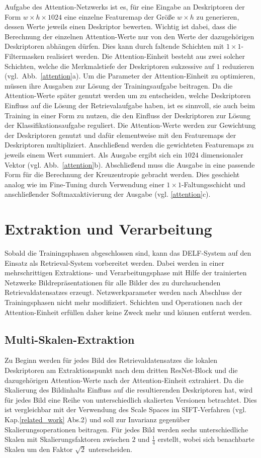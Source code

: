Aufgabe des Attention-Netzwerks ist es, für eine Eingabe an Deskriptoren der Form $w\times h\times 1024$ eine einzelne Featuremap der Größe $w\times h$ zu generieren, dessen Werte jeweils einen Deskriptor bewerten. Wichtig ist dabei, dass die Berechnung der einzelnen Attention-Werte nur von den Werte der dazugehörigen Deskriptoren abhängen dürfen. Dies kann durch faltende Schichten mit $1\times1$-Filtermasken realisiert werden. Die Attention-Einheit besteht aus zwei solcher Schichten, welche die Merkmalstiefe der Deskriptoren sukzessive auf $1$ reduzieren \mbox{(vgl. Abb.~\ref{attention}a).}  
Um die Parameter der Attention-Einheit zu optimieren, müssen ihre Ausgaben zur Lösung der Trainingsaufgabe beitragen. Da die Attention-Werte später genutzt werden um zu entscheiden, welche Deskriptoren Einfluss auf die Lösung der Retrievalaufgabe haben, ist es sinnvoll, sie auch beim Training in einer Form zu nutzen, die den Einfluss der Deskriptoren zur Lösung der Klassifikationsaufgabe reguliert. Die Attention-Werte werden zur Gewichtung der Deskriptoren genutzt und dafür elementweise mit den Featuremaps der Deskriptoren multipliziert. Anschließend werden die gewichteten Featuremaps zu jeweils einem Wert summiert. Als Ausgabe ergibt sich ein $1024$ dimensionaler Vektor (vgl. Abb.~\ref{attention}b). Abschließend muss die Ausgabe in eine passende Form für die Berechnung der Kreuzentropie gebracht werden. Dies geschieht analog wie im Fine-Tuning durch Verwendung einer $1\times1$-Faltungsschicht und anschließender Softmaxaktivierung der Ausgabe (vgl. \ref{attention}c).


\section{Extraktion und Verarbeitung}

Sobald die Trainingsphasen abgeschlossen sind, kann das DELF-System auf den Einsatz als Retrieval-System vorbereitet werden. Dabei werden in einer mehrschrittigen Extraktions- und Verarbeitungsphase mit Hilfe der trainierten Netzwerke Bildrepräsentationen für alle Bilder des zu durchsuchenden Retrievaldatensatzes erzeugt. Netzwerkparameter werden nach Abschluss der Trainingsphasen nicht mehr modifiziert. Schichten und Operationen nach der Attention-Einheit erfüllen daher keine Zweck mehr und können entfernt werden.
\subsection{Multi-Skalen-Extraktion}
Zu Beginn werden für jedes Bild des Retrievaldatensatzes die lokalen Deskriptoren am Extraktionspunkt nach dem dritten ResNet-Block und die dazugehörigen Attention-Werte nach der Attention-Einheit extrahiert. Da die Skalierung des Bildinhalts Einfluss auf die resultierenden Deskriptoren hat, wird für jedes Bild eine Reihe von unterschiedlich skalierten Versionen betrachtet. Dies ist vergleichbar mit der Verwendung des Scale Spaces im SIFT-Verfahren (vgl. Kap.\ref{related_work} Abs.2) und soll zur Invarianz gegenüber Skalierungsoperationen beitragen. Für jedes Bild werden sechs unterschiedliche Skalen mit Skalierungsfaktoren zwischen $2$ und $\frac{1}{4}$ erstellt, wobei sich benachbarte Skalen um den Faktor $\sqrt{2}$ unterscheiden. 
